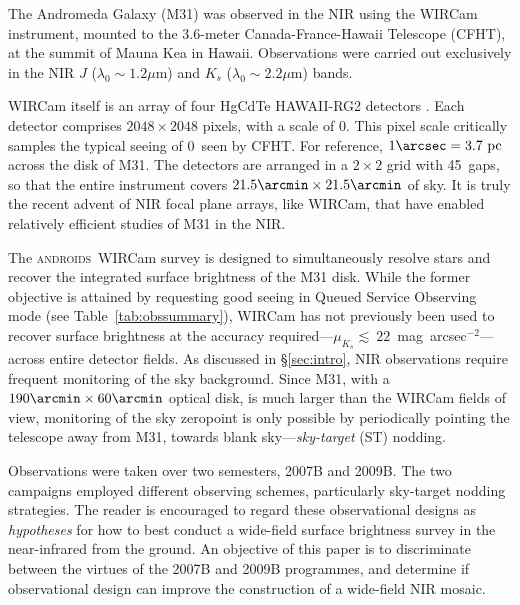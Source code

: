 \documentclass[iop]{emulateapj}
\newcommand{\androids}{\textsc{androids}}
\newcommand{\Tab}[1]{Table~\ref{tab:#1}}  %
\newcommand{\Sec}[1]{\S\ref{sec:#1}}  %
\begin{document}
The Andromeda Galaxy (M31) was observed in the NIR using the WIRCam instrument, mounted to the 3.6-meter Canada-France-Hawaii Telescope (CFHT), at the summit of Mauna Kea in Hawaii. Observations were carried out exclusively in the NIR $J$ ($\lambda_0 \sim 1.2 \mu\mathrm{m}$) and $K_s$ ($\lambda_0 \sim 2.2 \mu\mathrm{m}$) bands.

WIRCam itself is an array of four HgCdTe HAWAII-RG2 detectors \citep{Puget:2004}.
Each detector comprises $2048\times 2048$ pixels, with a scale of 0. This pixel scale critically samples the typical seeing of 0~seen by CFHT\@.
For reference, $1\arcsec = 3.7~\mathrm{pc}$ across the disk of M31.
The detectors are arranged in a $2\times 2$ grid with 45\arcsec~gaps, so that the entire instrument covers $21.5\arcmin \times 21.5\arcmin$ of sky. It is truly the recent advent of NIR focal plane arrays, like WIRCam, that have enabled relatively efficient studies of M31 in the NIR.

The \androids\ WIRCam survey is designed to simultaneously resolve stars and recover the integrated surface brightness of the M31 disk. While the former objective is attained by requesting good seeing in Queued Service Observing mode (see \Tab{obssummary}), WIRCam has not previously been used to recover surface brightness at the accuracy required---$\mu_{K_s}\lesssim~22$~mag~arcsec$^{-2}$---across entire detector fields. As discussed in \Sec{intro}, NIR observations require frequent monitoring of the sky background. Since M31, with a $190\arcmin \times 60\arcmin$ optical disk, is much larger than the WIRCam fields of view, monitoring of the sky zeropoint is only possible by periodically pointing the telescope away from M31, towards blank sky---\emph{sky-target} (ST) nodding. 

Observations were taken over two semesters, 2007B and 2009B. The two campaigns employed different observing schemes, particularly sky-target nodding strategies. The reader is encouraged to regard these observational designs as \emph{hypotheses} for how to best conduct a wide-field surface brightness survey in the near-infrared from the ground. An objective of this paper is to discriminate between the virtues of the 2007B and 2009B programmes, and determine if observational design can improve the construction of a wide-field NIR mosaic.
\end{document}
